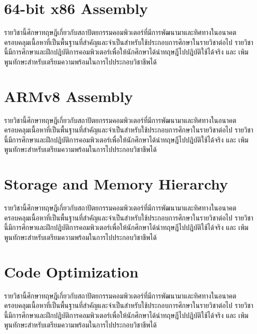 \documentclass[
  notoc %
]{tufte-book}
\begin{document}
\hypertarget{sec:x86_64assembly}{%
\chapter{64-bit x86 Assembly}\label{sec:x86_64assembly}}

รายวิชานี้ศึกษาทฤษฎีเกี่ยวกับสถาปัตยกรรมคอมพิวเตอร์ที่มีการพัฒนามาและทิศทางในอนาคต
ครอบคลุมเนื้อหาที่เป็นพื้นฐานที่สำคัญและจำเป็นสำหรับใช้ประกอบการศึกษาในรายวิชาต่อไป
รายวิชานี้มีการศึกษาและฝึกปฎิบัติการคอมพิวเตอร์เพื่อให้นักศึกษาได้นำทฤษฎีไปปฎิบัติใช้ได้จริง และ
เพิมพูนทักษะสำหรับเตรียมความพร้อมในการไปประกอบวิชาชีพได้

\hypertarget{sec:armv8assembly}{%
\chapter{ARMv8 Assembly}\label{sec:armv8assembly}}

รายวิชานี้ศึกษาทฤษฎีเกี่ยวกับสถาปัตยกรรมคอมพิวเตอร์ที่มีการพัฒนามาและทิศทางในอนาคต
ครอบคลุมเนื้อหาที่เป็นพื้นฐานที่สำคัญและจำเป็นสำหรับใช้ประกอบการศึกษาในรายวิชาต่อไป
รายวิชานี้มีการศึกษาและฝึกปฎิบัติการคอมพิวเตอร์เพื่อให้นักศึกษาได้นำทฤษฎีไปปฎิบัติใช้ได้จริง และ
เพิมพูนทักษะสำหรับเตรียมความพร้อมในการไปประกอบวิชาชีพได้

\hypertarget{sec:storagememorg}{%
\chapter{Storage and Memory Hierarchy}\label{sec:storagememorg}}

รายวิชานี้ศึกษาทฤษฎีเกี่ยวกับสถาปัตยกรรมคอมพิวเตอร์ที่มีการพัฒนามาและทิศทางในอนาคต
ครอบคลุมเนื้อหาที่เป็นพื้นฐานที่สำคัญและจำเป็นสำหรับใช้ประกอบการศึกษาในรายวิชาต่อไป
รายวิชานี้มีการศึกษาและฝึกปฎิบัติการคอมพิวเตอร์เพื่อให้นักศึกษาได้นำทฤษฎีไปปฎิบัติใช้ได้จริง และ
เพิมพูนทักษะสำหรับเตรียมความพร้อมในการไปประกอบวิชาชีพได้

\hypertarget{sec:codeopt}{%
\chapter{Code Optimization}\label{sec:codeopt}}

รายวิชานี้ศึกษาทฤษฎีเกี่ยวกับสถาปัตยกรรมคอมพิวเตอร์ที่มีการพัฒนามาและทิศทางในอนาคต
ครอบคลุมเนื้อหาที่เป็นพื้นฐานที่สำคัญและจำเป็นสำหรับใช้ประกอบการศึกษาในรายวิชาต่อไป
รายวิชานี้มีการศึกษาและฝึกปฎิบัติการคอมพิวเตอร์เพื่อให้นักศึกษาได้นำทฤษฎีไปปฎิบัติใช้ได้จริง และ
เพิมพูนทักษะสำหรับเตรียมความพร้อมในการไปประกอบวิชาชีพได้
\end{document}
